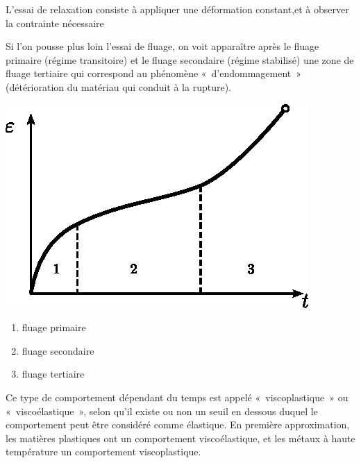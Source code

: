 L'essai de relaxation consiste à appliquer une déformation constant,­et à observer la contrainte nécessaire

Si l'on pousse plus loin l'essai de fluage, on voit apparaître après le fluage primaire (régime transitoire) et le fluage secondaire (régime stabilisé) une zone de fluage tertiaire qui correspond au phénomène «~d'endommagement~» (détérioration du matériau qui conduit à la rupture).
\begin{multicols}{2}
    \begin{center}
        \includegraphics{../images/T1_Ch04-0021}
    \end{center}
    \columnbreak
    \begin{enumerate}
        \item fluage primaire
        \item fluage secondaire
        \item fluage tertiaire
    \end{enumerate}
\end{multicols}

Ce type de comportement dépendant du temps est appelé «~viscoplastique~»  ou «~viscoélastique~», selon qu'il existe ou non un seuil en dessous duquel le comportement peut être considéré comme élastique.
En première approximation, les matières plastiques ont un comportement viscoélastique, et les métaux à haute température un comportement viscoplastique.

